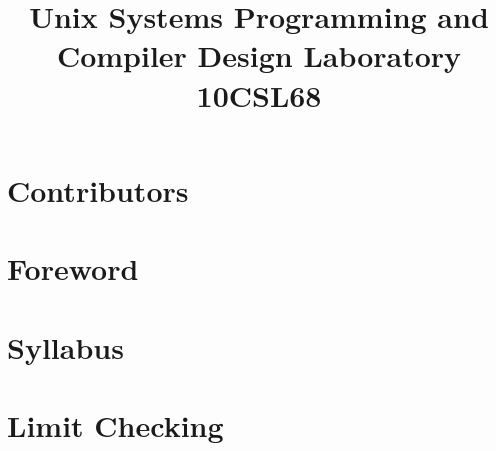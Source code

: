 \documentclass{report}
\begin{document}
\title{Unix Systems Programming and Compiler Design Laboratory \\ 10CSL68}
\maketitle

\chapter*{Contributors}


\chapter*{Foreword}


\tableofcontents

\chapter*{Syllabus}


\chapter{Limit Checking}

\end{document}
